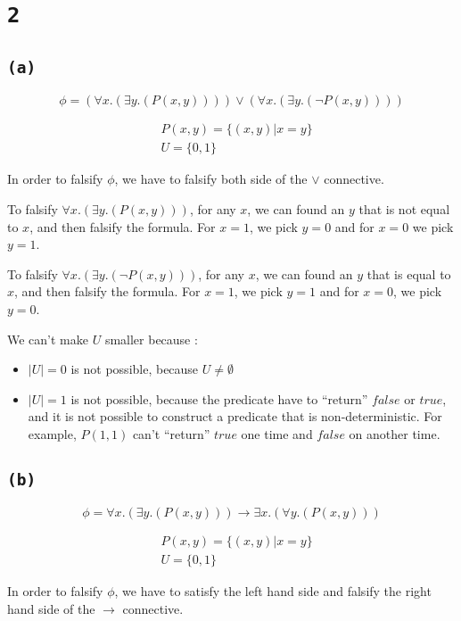 \documentclass[a4paper,11pt]{report}
\begin{document}
\section*{\texttt{2}}

\subsection*{\texttt{(a)}}

\[
  \phi = (\forall x.(\exists y.(P(x,y)))) \vee (\forall x.(\exists y.(\neg P(x,y))))
\]

\begin{align*}
  & P(x,y) = \{(x,y) | x = y\} \\
  & U = \{0,1\}
\end{align*}

In order to falsify $\phi$, we have to falsify both side of the $\vee$ connective.

To falsify $\forall x.(\exists y.(P(x,y)))$, for any $x$, we can found an $y$
that is not equal to $x$, and then falsify the formula. For $x=1$, we pick $y=0$
and for $x=0$ we pick $y=1$.

To falsify $\forall x.(\exists y.(\neg P(x,y)))$, for any $x$, we can found an
$y$ that is equal to $x$, and then falsify the formula. For $x=1$, we pick $y=1$
and for $x=0$, we pick $y=0$.

We can't make $U$ smaller because :
\begin{itemize}
\item $|U| = 0$ is not possible, because $U \neq \emptyset$
\item $|U| = 1$ is not possible, because the predicate have to ``return''
  $false$ or $true$, and it is not possible to construct a predicate that is
  non-deterministic. For example, $P(1,1)$ can't ``return'' $true$ one time and
  $false$ on another time.
\end{itemize}

\subsection*{\texttt{(b)}}

\[
  \phi = \forall x.(\exists y.(P(x,y))) \to \exists x.( \forall y.(P(x,y)))
\]

\begin{align*}
  & P(x,y) = \{(x,y) | x = y\} \\
  & U = \{0,1\}
\end{align*}

In order to falsify $\phi$, we have to satisfy the left hand side and falsify
the right hand side of the $\to$ connective.
\end{document}
